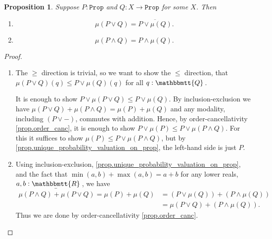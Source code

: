 \documentclass[11pt, oneside, article]{memoir}
\theoremstyle{plain}
\newtheorem{proposition}[theorem]{Proposition}
\theoremstyle{definition}
\theoremstyle{remark}
\newcommand{\const}[1]{\mathtt{#1}}
\newcommand{\ol}[1]{\overline{#1}}
\newcommand{\ubar}[1]{\underaccent{\bar}{#1}}
\newcommand{\internal}[1]{\raisebox{-.03ex}{$\mathbbmtt{#1}$}}
\newcommand{\hs}{\hspace{1.1pt}}
\newcommand{\tQQ}{\internal{Q}\hs}
\newcommand{\tRR}{\internal{R}\hs}
\newcommand{\tLR}{\ubar{\tRR}\hs}
\newcommand{\Prop}{\const{Prop}}
\begin{document}
\begin{proposition}\label{prop.valuations_OR}
Suppose $P:\Prop$ and $Q:X\to\Prop$ for some $X$. Then
\begin{enumerate}
\item \[\mu(P\vee Q)=\ol{P\vee\mu(Q)}.\]
\item \[\mu(P\wedge Q) = P \wedge \mu(Q).\]
\end{enumerate}
\end{proposition} 
\begin{proof}
\begin{enumerate}
\item The $\geq$ direction is trivial, so we want to show the $\leq$ direction, that $\mu(P\vee Q)(q)\leq P\vee\mu(Q)(q)$ for all $q:\tQQ$.

It is enough to show $P\vee\mu(P\vee Q)\leq P\vee\mu(Q)$. By inclusion-exclusion we have $\mu(P\vee Q)+\mu(P\wedge Q)=\mu(P)+\mu(Q)$ and any modality, including $(P\vee-)$, commutes with addition. Hence, by order-cancellativity \cref{prop.order_canc}, it is enough to show $P\vee\mu(P)\leq P\vee\mu(P\wedge Q)$.
For this it suffices to show $\mu(P)\leq P\vee\mu(P\wedge Q)$, but by \cref{prop.unique_probability_valuation_on_prop}, the left-hand side is just $P$.
\item Using inclusion-exclusion, \cref{prop.unique_probability_valuation_on_prop}, and the fact that $\min(a,b)+\max(a,b)=a+b$ for any lower reals, $a,b:\tLR$, we have
\begin{align*}
	\mu(P\wedge Q)+\mu(P\vee Q)=\mu(P)+\mu(Q)
	&=(P\vee\mu(Q))+(P\wedge\mu(Q))\\
	&=\mu(P\vee Q)+(P\wedge\mu(Q)).
\end{align*}
Thus we are done by order-cancellativity \cref{prop.order_canc}.
\end{enumerate}
\end{proof}
\end{document}
